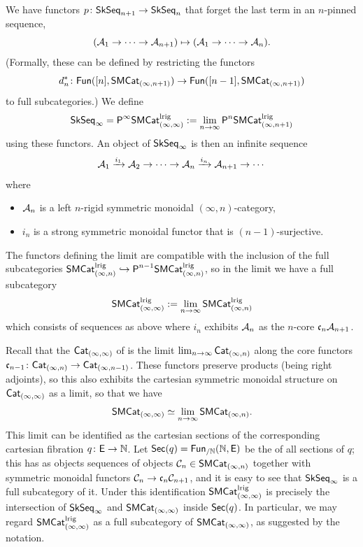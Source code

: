 \documentclass[a4paper,11pt]{article}
\begin{document}
\begin{defn}
  We have functors $p \colon \SkSeq_{n+1}  \to \SkSeq_{n}$ that forget the last term in an
  $n$-pinned sequence, \ie{}
  \[ (\nA_{1} \to \cdots \to \nA_{n+1}) \mapsto (\nA_{1} \to \cdots
    \to \nA_{n}).\]
  (Formally, these can be defined by restricting the functors
  \[ d_{n}^{*} \colon \Fun([n],\SMCat_{(\infty,n+1)}) \to \Fun([n-1],
    \SMCat_{(\infty,n+1)})\]
  to full subcategories.)
  We define
  \[ \SkSeq_{\infty} = \PSMCat[\infty]_{(\infty,\infty)}^{\lrig} := \limP_{n \rightarrow
      \infty} \PSMCat[n]_{(\infty,n+1)}^{\lrig}\]
  using these functors. An object of
  $\SkSeq_{\infty}$ is then an
  infinite sequence
  \[ \nA_{1} \xto{i_{1}} \nA_{2} \to \cdots \to \nA_{n} \xto{i_{n}}
    \nA_{n+1}  \to \cdots \]
  where
  \begin{itemize}
  \item $\nA_{n}$ is a left $n$-rigid symmetric monoidal
    $(\infty,n)$-category,
  \item $i_{n}$ is a strong symmetric monoidal functor that is $(n-1)$-surjective.
  \end{itemize}
  The functors defining the limit are compatible with the inclusion of
  the full subcategories $\SMCat_{(\infty,n)}^{\lrig}
  \hookrightarrow \PSMCat[n-1]_{(\infty,n)}^{\lrig}$, so in the
  limit we have a full subcategory
  \[ \SMCat_{(\infty,\infty)}^{\lrig} := \limP_{n \rightarrow
      \infty} \SMCat_{(\infty,n)}^{\lrig}\]
  which consists of sequences as above where $i_{n}$ exhibits
  $\nA_{n}$ as the $n$-core $\core[n] \nA_{n+1}$.
\end{defn}

\begin{observation}
  Recall that the \icat{} $\CatII$ of \emph{\iicats{}} is the limit
  $\limP_{n \rightarrow \infty} \CatIn$ along the core functors $\core[n-1]
  \colon \CatIn \to \CatInm$. These functors preserve products (being
  right adjoints), so this also exhibits the cartesian symmetric
  monoidal structure on $\CatII$ as a limit, so that we have
  \[ \SMCatII \simeq \limP_{n \rightarrow \infty} \SMCatIn.\] This limit can
  be identified as the cartesian sections of the corresponding
  cartesian fibration $q \colon \oE \to \mathbb{N}$. Let
  $\catname{Sec}(q) = \Fun_{/\mathbb{N}}(\mathbb{N}, \oE)$ be the
  \icat{} of all sections of $q$; this has as objects sequences of
  objects $\nC_{n} \in \SMCatIn$ together with symmetric monoidal
  functors $\nC_{n} \to \core[n] \nC_{n+1}$, and it is easy to see
  that $\SkSeq_{\infty}$ is a full subcategory of it. Under this
  identification $\SMCatII^{\lrig}$ is precisely the intersection of
  $\SkSeq_{\infty}$ and $\SMCatII$ inside $\catname{Sec}(q)$. In
  particular, we may regard $\SMCatII^{\lrig}$ as a full subcategory of
  $\SMCatII$, as suggested by the notation.
\end{observation}
\end{document}
